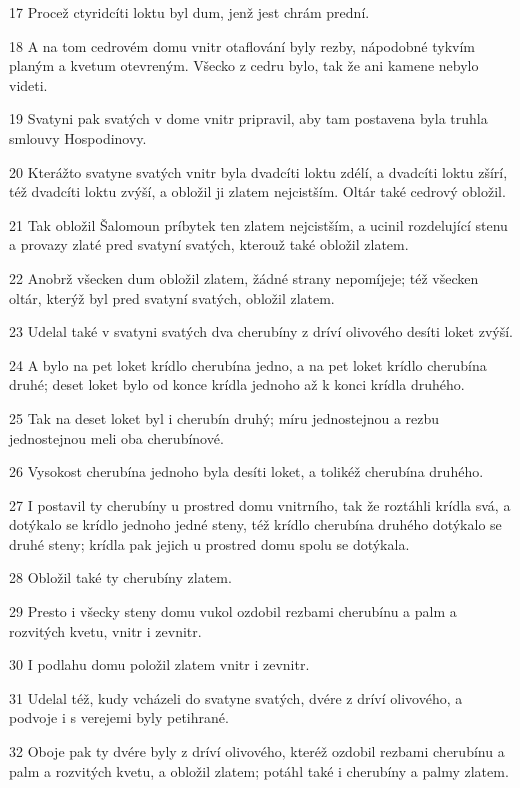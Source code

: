 \par 17 Procež ctyridcíti loktu byl dum, jenž jest chrám prední.
\par 18 A na tom cedrovém domu vnitr otaflování byly rezby, nápodobné tykvím planým a kvetum otevreným. Všecko z cedru bylo, tak že ani kamene nebylo videti.
\par 19 Svatyni pak svatých v dome vnitr pripravil, aby tam postavena byla truhla smlouvy Hospodinovy.
\par 20 Kterážto svatyne svatých vnitr byla dvadcíti loktu zdélí, a dvadcíti loktu zšírí, též dvadcíti loktu zvýší, a obložil ji zlatem nejcistším. Oltár také cedrový obložil.
\par 21 Tak obložil Šalomoun príbytek ten zlatem nejcistším, a ucinil rozdelující stenu a provazy zlaté pred svatyní svatých, kterouž také obložil zlatem.
\par 22 Anobrž všecken dum obložil zlatem, žádné strany nepomíjeje; též všecken oltár, kterýž byl pred svatyní svatých, obložil zlatem.
\par 23 Udelal také v svatyni svatých dva cherubíny z dríví olivového desíti loket zvýší.
\par 24 A bylo na pet loket krídlo cherubína jedno, a na pet loket krídlo cherubína druhé; deset loket bylo od konce krídla jednoho až k konci krídla druhého.
\par 25 Tak na deset loket byl i cherubín druhý; míru jednostejnou a rezbu jednostejnou meli oba cherubínové.
\par 26 Vysokost cherubína jednoho byla desíti loket, a tolikéž cherubína druhého.
\par 27 I postavil ty cherubíny u prostred domu vnitrního, tak že roztáhli krídla svá, a dotýkalo se krídlo jednoho jedné steny, též krídlo cherubína druhého dotýkalo se druhé steny; krídla pak jejich u prostred domu spolu se dotýkala.
\par 28 Obložil také ty cherubíny zlatem.
\par 29 Presto i všecky steny domu vukol ozdobil rezbami cherubínu a palm a rozvitých kvetu, vnitr i zevnitr.
\par 30 I podlahu domu položil zlatem vnitr i zevnitr.
\par 31 Udelal též, kudy vcházeli do svatyne svatých, dvére z dríví olivového, a podvoje i s verejemi byly petihrané.
\par 32 Oboje pak ty dvére byly z dríví olivového, kteréž ozdobil rezbami cherubínu a palm a rozvitých kvetu, a obložil zlatem; potáhl také i cherubíny a palmy zlatem.
